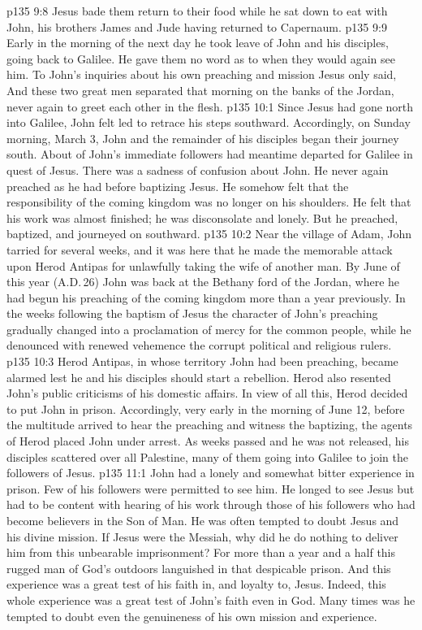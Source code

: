 \vs p135 9:8 Jesus bade them return to their food while he sat down to eat with John, his brothers James and Jude having returned to Capernaum.
\vs p135 9:9 \pc Early in the morning of the next day he took leave of John and his disciples, going back to Galilee. He gave them no word as to when they would again see him. To John’s inquiries about his own preaching and mission Jesus only said,  And these two great men separated that morning on the banks of the Jordan, never again to greet each other in the flesh.
\vs p135 10:1 Since Jesus had gone north into Galilee, John felt led to retrace his steps southward. Accordingly, on Sunday morning, March 3, John and the remainder of his disciples began their journey south. About  of John’s immediate followers had meantime departed for Galilee in quest of Jesus. There was a sadness of confusion about John. He never again preached as he had before baptizing Jesus. He somehow felt that the responsibility of the coming kingdom was no longer on his shoulders. He felt that his work was almost finished; he was disconsolate and lonely. But he preached, baptized, and journeyed on southward.
\vs p135 10:2 Near the village of Adam, John tarried for several weeks, and it was here that he made the memorable attack upon Herod Antipas for unlawfully taking the wife of another man. By June of this year (A.D.\,26) John was back at the Bethany ford of the Jordan, where he had begun his preaching of the coming kingdom more than a year previously. In the weeks following the baptism of Jesus the character of John’s preaching gradually changed into a proclamation of mercy for the common people, while he denounced with renewed vehemence the corrupt political and religious rulers.
\vs p135 10:3 Herod Antipas, in whose territory John had been preaching, became alarmed lest he and his disciples should start a rebellion. Herod also resented John’s public criticisms of his domestic affairs. In view of all this, Herod decided to put John in prison. Accordingly, very early in the morning of June 12, before the multitude arrived to hear the preaching and witness the baptizing, the agents of Herod placed John under arrest. As weeks passed and he was not released, his disciples scattered over all Palestine, many of them going into Galilee to join the followers of Jesus.
\vs p135 11:1 John had a lonely and somewhat bitter experience in prison. Few of his followers were permitted to see him. He longed to see Jesus but had to be content with hearing of his work through those of his followers who had become believers in the Son of Man. He was often tempted to doubt Jesus and his divine mission. If Jesus were the Messiah, why did he do nothing to deliver him from this unbearable imprisonment? For more than a year and a half this rugged man of God’s outdoors languished in that despicable prison. And this experience was a great test of his faith in, and loyalty to, Jesus. Indeed, this whole experience was a great test of John’s faith even in God. Many times was he tempted to doubt even the genuineness of his own mission and experience.
